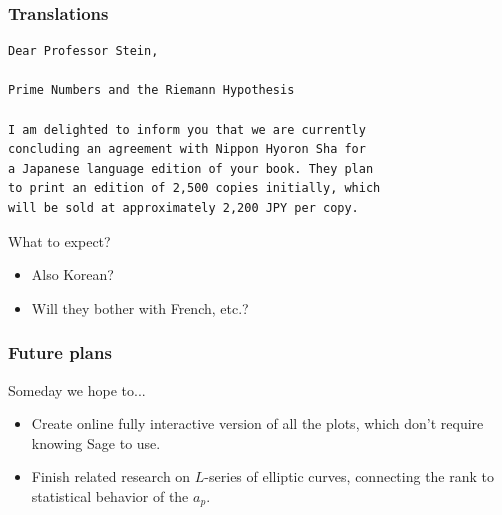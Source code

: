 \documentclass{beamer}
\begin{document}
\begin{frame}[fragile]
  \frametitle{Translations}
  \begin{verbatim}
Dear Professor Stein,

Prime Numbers and the Riemann Hypothesis

I am delighted to inform you that we are currently
concluding an agreement with Nippon Hyoron Sha for
a Japanese language edition of your book. They plan
to print an edition of 2,500 copies initially, which
will be sold at approximately 2,200 JPY per copy.
  \end{verbatim}

  What to expect?
  \begin{itemize}
    \item  Also Korean?
    \item  Will they bother with French, etc.?
  \end{itemize}
\end{frame}


\begin{frame}
  \frametitle{Future plans}
  \begin{block}{Someday we hope to...}
    \begin{itemize}
      \item Create online fully interactive version of all the
            plots, which don't require knowing Sage to use.
      \item Finish related research on $L$-series of elliptic curves, connecting the rank to statistical
            behavior of the $a_p$.
    \end{itemize}
  \end{block}
\end{frame}
\end{document}
